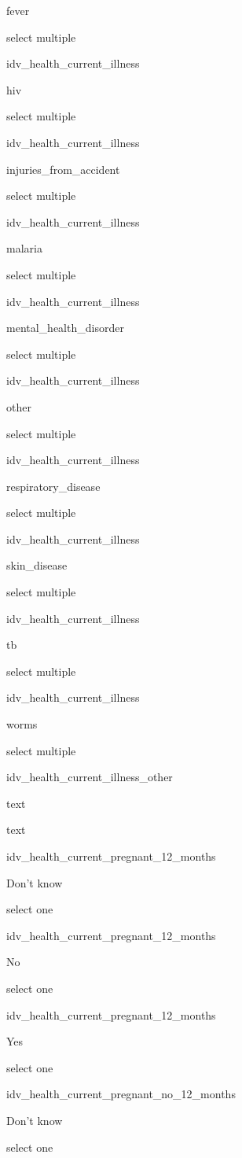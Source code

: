 \documentclass[]{article}
\begin{document}
fever

select multiple

idv\_health\_current\_illness

hiv

select multiple

idv\_health\_current\_illness

injuries\_from\_accident

select multiple

idv\_health\_current\_illness

malaria

select multiple

idv\_health\_current\_illness

mental\_health\_disorder

select multiple

idv\_health\_current\_illness

other

select multiple

idv\_health\_current\_illness

respiratory\_disease

select multiple

idv\_health\_current\_illness

skin\_disease

select multiple

idv\_health\_current\_illness

tb

select multiple

idv\_health\_current\_illness

worms

select multiple

idv\_health\_current\_illness\_other

text

text

idv\_health\_current\_pregnant\_12\_months

Don't know

select one

idv\_health\_current\_pregnant\_12\_months

No

select one

idv\_health\_current\_pregnant\_12\_months

Yes

select one

idv\_health\_current\_pregnant\_no\_12\_months

Don't know

select one
\end{document}
